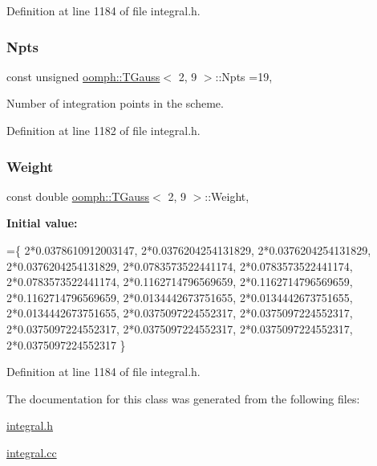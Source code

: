 Definition at line 1184 of file integral.\+h.

\mbox{\label{classoomph_1_1TGauss_3_012_00_019_01_4_adbb9f0ca0c71842bbb3bfb56e5e4ac91}} 
\subsubsection{\texorpdfstring{Npts}{Npts}}
{\footnotesize\ttfamily const unsigned \hyperlink{classoomph_1_1TGauss}{oomph\+::\+T\+Gauss}$<$ 2, 9 $>$\+::Npts =19\hspace{0.3cm}{\ttfamily [static]}, {\ttfamily [private]}}



Number of integration points in the scheme. 



Definition at line 1182 of file integral.\+h.

\mbox{\label{classoomph_1_1TGauss_3_012_00_019_01_4_a5bc109adedda0d2f97710811c46faf63}} 
\subsubsection{\texorpdfstring{Weight}{Weight}}
{\footnotesize\ttfamily const double \hyperlink{classoomph_1_1TGauss}{oomph\+::\+T\+Gauss}$<$ 2, 9 $>$\+::Weight\hspace{0.3cm}{\ttfamily [static]}, {\ttfamily [private]}}

{\bfseries Initial value\+:}
\begin{DoxyCode}
=\{
  2*0.0378610912003147,
  2*0.0376204254131829,
  2*0.0376204254131829,
  2*0.0376204254131829,
  2*0.0783573522441174,
  2*0.0783573522441174,
  2*0.0783573522441174,
  2*0.1162714796569659,
  2*0.1162714796569659,
  2*0.1162714796569659,
  2*0.0134442673751655,
  2*0.0134442673751655,
  2*0.0134442673751655,
  2*0.0375097224552317,
  2*0.0375097224552317,
  2*0.0375097224552317,
  2*0.0375097224552317,
  2*0.0375097224552317,
  2*0.0375097224552317
 \}
\end{DoxyCode}


Definition at line 1184 of file integral.\+h.



The documentation for this class was generated from the following files\+:\begin{DoxyCompactItemize}
\item 
\hyperlink{integral_8h}{integral.\+h}\item 
\hyperlink{integral_8cc}{integral.\+cc}\end{DoxyCompactItemize}
